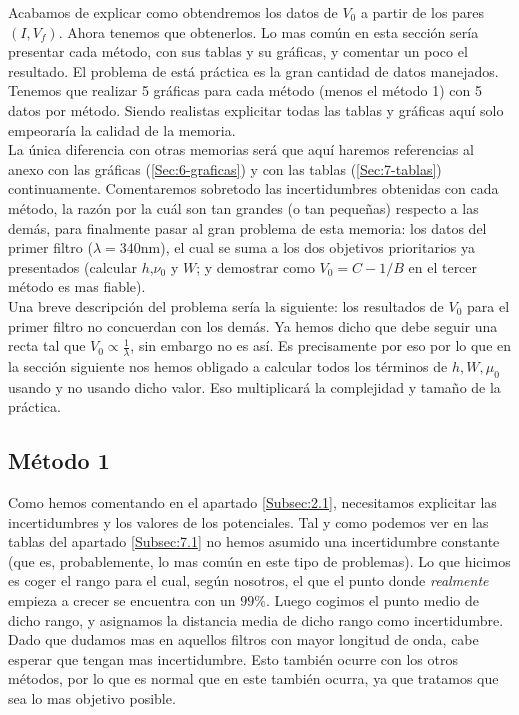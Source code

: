 \documentclass[12pt,a4paper]{article}
\numberwithin{equation}{section}
\numberwithin{table}{section}
\numberwithin{figure}{section}
\begin{document}
Acabamos de explicar como obtendremos los datos de $V_0$ a partir de los pares  $(I,V_f)$. Ahora tenemos que obtenerlos. Lo mas común en esta sección sería presentar cada método, con sus tablas y su gráficas, y comentar un poco el resultado. El problema de está práctica es la gran cantidad de datos manejados. Tenemos que realizar 5 gráficas para cada método (menos el método 1) con 5 datos por método. Siendo realistas explicitar todas las tablas y gráficas aquí solo empeoraría la calidad de la memoria. \\

La única diferencia con otras memorias será que aquí haremos referencias al anexo con las gráficas (\ref{Sec:6-graficas}) y con las tablas (\ref{Sec:7-tablas}) continuamente. Comentaremos sobretodo las incertidumbres obtenidas con cada método, la razón por la cuál son tan grandes (o tan pequeñas) respecto a las demás, para finalmente pasar al gran problema de esta memoria: los datos del primer filtro ($\lambda=340$nm), el cual se suma a los dos objetivos prioritarios ya presentados (calcular $h$,$\nu_0$ y $W$; y demostrar como $V_0 = C-1/B$ en el tercer método es mas fiable). \\

Una breve descripción del problema sería la siguiente: los resultados de $V_0$ para el primer filtro no concuerdan con los demás. Ya hemos dicho que debe seguir una recta tal que $V_0 \varpropto \frac{1}{\lambda}$, sin embargo no es así. Es precisamente por eso por lo que en la sección siguiente nos hemos obligado a calcular todos los términos de $h,W,\mu_0$ usando y no usando dicho valor. Eso multiplicará la complejidad y tamaño de la práctica. 

\subsection{Método 1}

Como hemos comentando en el apartado \ref{Subsec:2.1}, necesitamos explicitar las incertidumbres y los valores de los potenciales. Tal y como podemos ver en las tablas del apartado \ref{Subsec:7.1} no hemos asumido una incertidumbre constante (que es, probablemente, lo mas común en este tipo de problemas). Lo que hicimos es coger el rango para el cual, según nosotros, el que el punto donde \textit{realmente} empieza a crecer se encuentra con un $99\%$. Luego cogimos el punto medio de dicho rango, y asignamos la distancia media de dicho rango como incertidumbre. Dado que dudamos mas en aquellos filtros con mayor longitud de onda, cabe esperar que tengan mas incertidumbre. Esto también ocurre con los otros métodos, por lo que es normal que en este también ocurra, ya que tratamos que sea lo mas objetivo posible. \\
\end{document}
